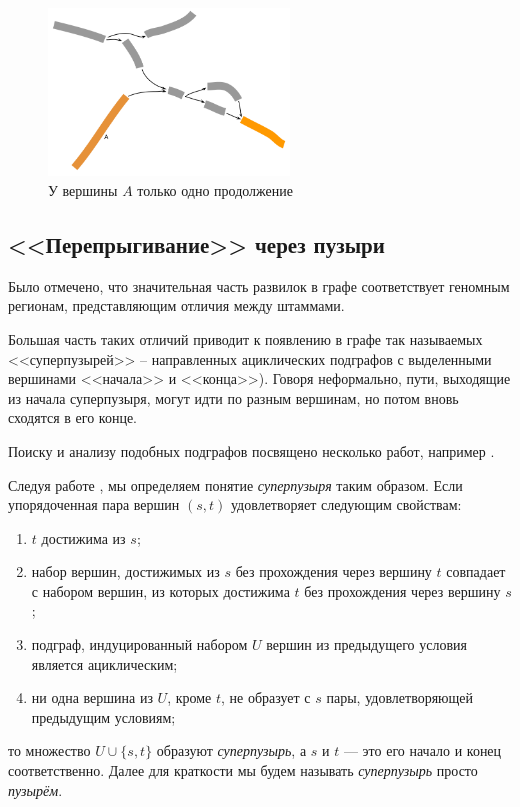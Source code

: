 \documentclass{spbau-diploma}
\begin{document}
\begin{figure}[t]
\centering
\includegraphics[width=0.57\textwidth]{pics/one_continue.png}
\caption{У вершины $A$ только одно продолжение}
\label{one_continue}
\end{figure}


\subsection{<<Перепрыгивание>> через пузыри}

Было отмечено, что значительная часть развилок в графе соответствует геномным регионам, представляющим отличия между штаммами.

Большая часть таких отличий приводит к появлению в графе так называемых <<суперпузырей>> -- направленных ациклических подграфов с выделенными вершинами <<начала>> и <<конца>>). Говоря неформально, пути, выходящие из начала суперпузыря, могут идти по разным вершинам, но потом вновь сходятся в его конце.  

Поиску и анализу подобных подграфов посвящено несколько работ, например \cite{superbubbles, MaryGold, cacti}.

Следуя работе \cite{superbubbles}, мы определяем понятие \textit{суперпузыря} таким образом. Если упорядоченная пара вершин $(s,t)$ удовлетворяет следующим свойствам:
\begin{enumerate}
    \item $t$ достижима из $s$;
    \item набор вершин, достижимых из $s$ без прохождения через вершину $t$ совпадает с набором вершин, из которых достижима $t$ без прохождения через вершину $s$;
    \item подграф, индуцированный набором $U$ вершин из предыдущего условия является ациклическим;
    \item ни одна вершина из $U$, кроме $t$, не образует с $s$ пары, удовлетворяющей предыдущим условиям;  
\end{enumerate}
то множество $U \cup \{s,t\}$ образуют \textit{суперпузырь}, а $s$ и $t$ --- это его начало и конец соответственно. Далее для краткости мы будем называть \textit{суперпузырь} просто \textit{пузырём}.
\end{document}
